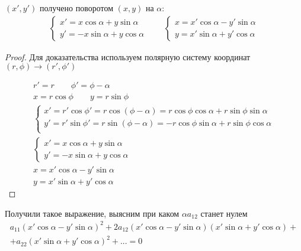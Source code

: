 \begin{theorem}
    $(x', y')$ получено поворотом $(x,y)$ на $\alpha$:
    \begin{gather*}
        \begin{cases}
            x' = x \cos \alpha + y \sin \alpha \\
            y' = - x \sin \alpha + y \cos \alpha
        \end{cases}\qquad
        \begin{cases}
            x = x' \cos \alpha - y' \sin \alpha \\
            y = x' \sin \alpha + y' \cos \alpha
        \end{cases}
    \end{gather*}
\end{theorem}
\begin{proof}
    Для доказательства используем полярную систему координат $(r, \phi) \to (r', \phi')$

    \begin{gather*}
        r' = r \qquad \phi' = \phi - \alpha\\
        x = r \cos \phi \qquad y = r \sin \phi \\
        \begin{cases}
            x' = r' \cos \phi' = r \cos (\phi - \alpha) = r \cos \phi \cos \alpha + r \sin \phi \sin \alpha  \\
            y' = r' \sin \phi' = r \sin (\phi - \alpha) = -r \cos \phi \sin \alpha + r \sin \phi \cos \alpha \\
        \end{cases}\\
        \begin{cases}
            x' = x \cos \alpha + y \sin \alpha \\
            y' = -x \sin \alpha + y \cos \alpha
        \end{cases}\\
        x = x' \cos \alpha - y' \sin \alpha\\
        y = x' \sin \alpha + y' \cos \alpha
    \end{gather*}
\end{proof}

Получили такое выражение, выясним при каком $\alpha a_{12}$ станет нулем
\begin{multline*}
    a_{11} (x' \cos \alpha - y' \sin \alpha)^2 + 2a_{12} (x' \cos \alpha - y' \sin \alpha)(x' \sin \alpha + y' \cos \alpha) + \\
    + a_{22} (x' \sin \alpha + y' \cos \alpha)^2 + ... = 0
\end{multline*}

